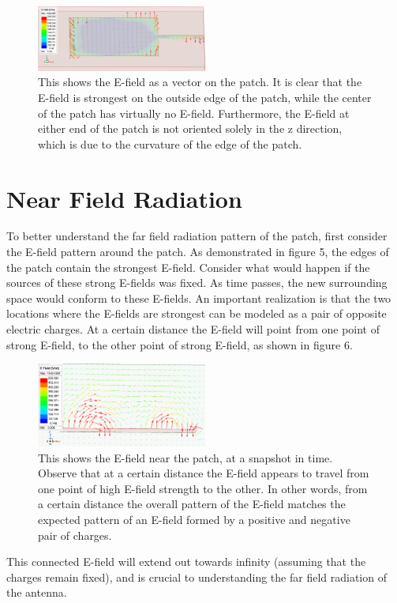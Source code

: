 \documentclass[12pt]{article}
\begin{document}
\begin{figure}[h]
    \centering
    \includegraphics[width=0.5\textwidth]{basic-patch-antenna-VecE-onPatch-t0.png}
    \caption{This shows the E-field as a vector on the patch. It is clear that the E-field is strongest on the outside edge of the patch, while the center of the patch has virtually no E-field. Furthermore, the E-field at either end of the patch is not oriented solely in the z direction, which is due to the curvature of the edge of the patch.}
\end{figure}
  

\section{Near Field Radiation}

To better understand the far field radiation pattern of the patch, first consider the E-field pattern around the patch. As demonstrated in figure 5, the edges of the patch contain the strongest E-field. Consider what would happen if the sources of these strong E-fields was fixed. As time passes, the new surrounding space would conform to these E-fields. An important realization is that the two locations where the E-fields are strongest can be modeled as a pair of opposite electric charges. At a certain distance the E-field will point from one point of strong E-field, to the other point of strong E-field, as shown in figure 6.

\begin{figure}[h]
    \centering
    \includegraphics[width=0.5\textwidth]{basic-patch-antenna-near-Efield.png}
    \caption{This shows the E-field near the patch, at a snapshot in time. Observe that at a certain distance the E-field appears to travel from one point of high E-field strength to the other. In other words, from a certain distance the overall pattern of the E-field matches the expected pattern of an E-field formed by a positive and negative pair of charges.}
\end{figure}  
This connected E-field will extend out towards infinity (assuming that the charges remain fixed), and is crucial to understanding the far field radiation of the antenna. 
\end{document}

